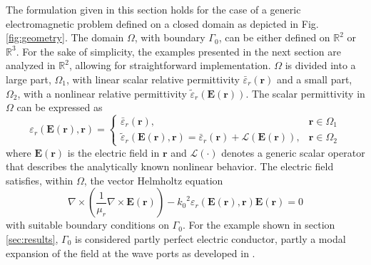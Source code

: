 \documentclass[journal]{IEEEtran}
\renewcommand{\vec}[1]{\mathbf{#1}}
\begin{document}
\par The formulation given in this section holds for the case of a generic electromagnetic problem defined on a closed domain as depicted in Fig. \ref{fig:geometry}. The domain $\Omega$, with boundary $\Gamma_0$, can be either defined on $\mathbb R^2$ or $\mathbb R^3$. For the sake of simplicity, the examples presented in the next section are analyzed in $\mathbb R^2$, allowing for straightforward implementation. $\Omega$ is divided into a large part, $\Omega_1$, with linear scalar relative permittivity $\bar{\varepsilon}_r(\vec{r})$ and a small part, $\Omega_2$, with a nonlinear relative permittivity $\tilde{\varepsilon}_r(\vec{E}(\vec{r}))$.
The scalar permittivity in $\Omega$ can be expressed as 
\begin{equation}
\varepsilon_r(\vec{E}(\vec{r}),\vec{r}) = 
\begin{cases}
\bar{\varepsilon}_r(\vec{r}), & \vec{r} \in \Omega_1 \\
\tilde{\varepsilon}_r(\vec{E}(\vec{r}), \vec{r}) = \bar{\varepsilon}_r(\vec{r}) + \mathcal{L}(\vec{E}(\vec{r})), & \vec{r} \in \Omega_2
\end{cases}
\end{equation} where $\vec{E}(\vec{r})$ is the electric field in $\vec{r}$ and $\mathcal{L}(\cdot)$ denotes a generic scalar operator that describes the analytically known nonlinear behavior. The electric field satisfies, within $\Omega$, the vector Helmholtz equation
\begin{equation}
\label{eq:helmholtz}
\nabla \times \left ( \frac{1}{\mu_r} \nabla \times \vec{E}(\vec{r}) \right )  - {k_0}^2 \varepsilon_r \left(\vec{E}(\vec{r}), \vec{r} \right) \vec{E}(\vec{r}) = 0
\end{equation} with suitable boundary conditions on $\Gamma_0$. For the example shown in section \ref{sec:results}, $\Gamma_0$ is considered partly perfect electric conductor, partly a modal expansion of the field at the wave ports as developed in \cite{Pelosi2009}. 
\end{document}
